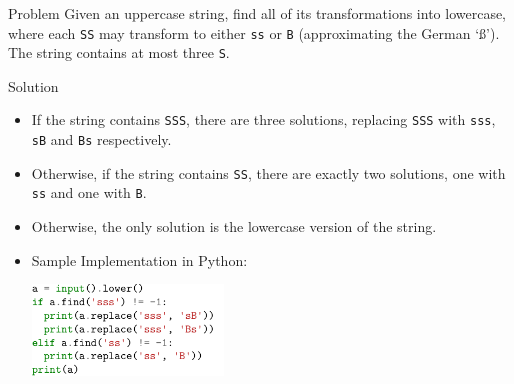 \begin{frame}
  \frametitle{\problemtitle}
  \begin{block}{Problem}
    Given an uppercase string, find all of its transformations into lowercase, where each \texttt{SS} may transform to either \texttt{ss} or \texttt{B} (approximating the German `ß'). The string contains at most three \texttt{S}.
  \end{block}
  \pause
  \begin{block}{Solution}
    \begin{itemize}
      \item<+-> If the string contains \texttt{SSS}, there are three solutions, replacing \texttt{SSS} with \texttt{sss}, \texttt{sB} and \texttt{Bs} respectively.
      \item<+-> Otherwise, if the string contains \texttt{SS}, there are exactly two solutions, one with \texttt{ss} and one with \texttt{B}.
      \item<+-> Otherwise, the only solution is the lowercase version of the string.
      \item<+-> Sample Implementation in Python:
        \vspace{3mm}

        \hspace{5mm}\includegraphics[width=0.4\textwidth]{python}
    \end{itemize}
  \end{block}
\end{frame}
